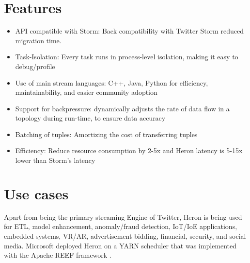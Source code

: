 \documentclass[9pt,twocolumn,twoside]{styles/osajnl}
\begin{document}
\section{Features}
\begin{itemize}
    \item API compatible with Storm: Back compatibility with Twitter Storm reduced migration time. 
    \item Task-Isolation: Every task runs in process-level isolation, making it easy to debug/profile
    \item Use of main stream languages: C++, Java, Python for efficiency, maintainability, and easier community adoption
    \item Support for backpressure: dynamically adjusts the rate of data flow in a topology during run-time, to ensure data accuracy
    \item Batching of tuples: Amortizing the cost of transferring tuples
    \item Efficiency: Reduce resource consumption by 2-5x and Heron latency is 5-15x lower than Storm’s latency \cite{www-FlyFasterHeron}
\end{itemize}
\section{Use cases}
Apart from being the primary streaming Engine of Twitter, Heron is being used for ETL, model enhancement, anomaly/fraud detection, IoT/IoE applications, embedded systems, VR/AR, advertisement bidding, financial, security, and social media\cite{www-openSourceHeron}. Microsoft deployed Heron on a YARN scheduler that was implemented with the Apache REEF framework \cite{www-HeronYARN}.
\end{document}
